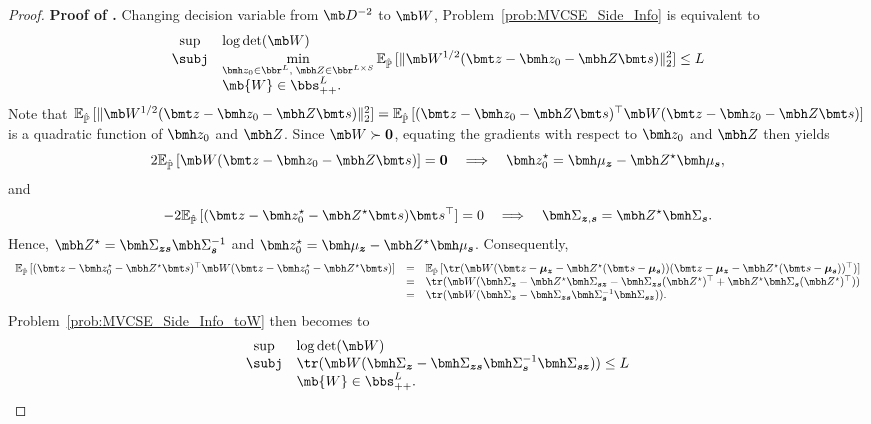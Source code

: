 \documentclass[opre, blindrev]{informs4}
\newcommand{\1}[1]{\mathds{1}{\left(#1\right)}}
\begin{document}
\begin{appendices}
\begin{proof}{\bf Proof of .}
Changing decision variable from $\mb D^{-2} $ to $\mb W$, Problem~\eqref{prob:MVCSE_Side_Info} is equivalent to
\begin{equation}
\label{prob:MVCSE_Side_Info_toW}
\begin{array}{cll}
\sup & \log\det(\mb W) \\
\subj & \displaystyle \min_{\bmh z_0\in \bbr^L, \; \mbh Z\in \bbr^{L \times S}} \mathbb{E}_{\hat{\mathbb{P}}}\,[\|\mb W^{1/2} ( \bmt z - \bmh z_0- \mbh Z\bmt s )\|_2^2] \leq L \\
& \mb{W} \in \bbs^{L}_{++}.  
\end{array} 
\end{equation}
Note that
$\mathbb{E}_{\hat{\mathbb{P}}}\,[\|\mb W^{1/2} ( \bmt z - \bmh z_0- \mbh Z\bmt s )\|_2^2] = \mathbb{E}_{\hat{\mathbb{P}}}\,[(\bmt z - \bmh z_0- \mbh Z\bmt s )^\top  \mb W (\bmt z - \bmh z_0- \mbh Z\bmt s)]$ is a quadratic function of $\bmh z_0$ and $\mbh Z$. Since $\mb W \succ \bm 0$, equating the gradients with respect to $\bmh z_0$ and $\mbh Z$ then yields
$$
2 \mathbb{E}_{\hat{\mathbb{P}}}\,[\mb W ( \bmt z - \bmh z_0- \mbh Z\bmt s )] = \bm 0 ~~~\Longrightarrow~~~
\bmh z_0^\star = \bmh \mu_{\bm z} - \mbh Z^\star \bmh \mu_{\bm s},
$$
and
$$
- 2 \mathbb{E}_{\hat{\mathbb{P}}}\,[(\bmt z - \bmh z_0^\star - \mbh Z^\star \bmt s) \bmt s^\top] = 0 
~~~\Longrightarrow~~~
\bmh \Sigma_{\bm z, \bm s} = \mbh Z^\star \bmh \Sigma_{\bm s}.
$$
Hence, $\mbh Z^\star = \bmh \Sigma_{\bm z \bm s} \mbh \Sigma_{\bm s}^{-1}$ and $\bmh z_0^\star = \bmh \mu_{\bm z} - \mbh Z^\star \bmh \mu_{\bm s}$. Consequently,
\[
\begin{array}{rcl}
\mathbb{E}_{\hat{\mathbb{P}}}\,[(\bmt z - \bmh z_0^\star - \mbh Z^\star \bmt s )^\top  \mb W ( \bmt z - \bmh z_0^\star - \mbh Z^\star \bmt s)] 
& = & \mathbb{E}_{\hat{\mathbb{P}}}\,[\tr(\mb W (\bmt z - \bm \mu_{\bm z} - \mbh Z^\star (\bmt s - \bm \mu_{\bm s}) ) (\bmt z - \bm \mu_{\bm z} - \mbh Z^\star (\bmt s - \bm \mu_{\bm s}) )^\top)] \\
& = & \tr(\mb W (\bmh \Sigma_{\bm z} - \mbh Z^\star \bmh \Sigma_{\bm s \bm z} - \bmh \Sigma_{\bm z \bm s} (\mbh Z^\star)^\top + \mbh Z^\star \bmh \Sigma_{\bm s} (\mbh Z^\star)^\top)) \\
& = & \tr(\mb W (\bmh \Sigma_{\bm z} - \bmh \Sigma_{\bm z \bm s} \bmh \Sigma_{\bm s}^{-1} \bmh \Sigma_{\bm s \bm z})).
\end{array}
\]
Problem~\eqref{prob:MVCSE_Side_Info_toW} then becomes to
\begin{equation}
\label{prob:MVCSE_Side_Info_toW2}
\begin{array}{cll}
\sup & \log\det(\mb W) \\
\subj & \displaystyle \tr(\mb W (\bmh \Sigma_{\bm z} - \bmh \Sigma_{\bm z \bm s} \bmh \Sigma_{\bm s}^{-1} \bmh \Sigma_{\bm s \bm z})) \leq L \\
&  \mb{W} \in \bbs^{L}_{++}.  
\end{array} 
\end{equation}


\end{proof}
\end{appendices}
\end{document}
